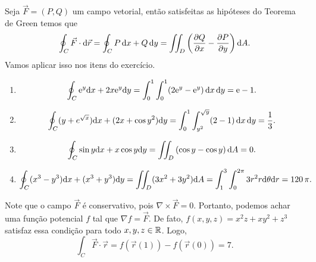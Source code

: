 \begin{questions}
\begin{solution}
Seja $\vec F = (P,Q)$ um campo vetorial, então satisfeitas as hipóteses do Teorema de Green temos que
\[
    \oint_C \vec F \cdot \mathrm{d} \vec r
        = \oint_C P\,\mathrm{d} x + Q\,\mathrm{d} y
        = \iint_D \left(\frac{\partial Q}{\partial x} - \frac{\partial P}{\partial y}\right) \mathrm{d} A.
\]
Vamos aplicar isso nos itens do exercício.
\begin{enumerate}[label=(\alph*)]
  \item 
  \[
    \oint_C \mathrm{e}^y \mathrm{d} x + 2x \mathrm{e}^y \mathrm{d} y
        = \int_0^1\int_0^1 (2\mathrm{e}^y-\mathrm{e}^y)\, \mathrm{d} x\,\mathrm{d} y
        = \mathrm{e}-1.
  \]
  
  \item
  \[
    \oint_C (y + e^{\sqrt{x}}) \mathrm{d} x + (2x + \cos y^2) \mathrm{d} y
        = \int_0^1 \int_{y^2}^{\sqrt{y}} (2 - 1)\, \mathrm{d} x\, \mathrm{d} y
        = \frac{1}{3}.
  \]
  
  \item 
  \[
  \oint_C \sin y \mathrm{d} x + x\cos y \mathrm{d} y
    = \iint_D \left( \cos y - \cos y \right) \mathrm{d} A
    = 0.
  \]
  
  \item 
  \[
    \oint_C (x^3 - y^3) \mathrm{d} x + (x^3 + y^3) \mathrm{d} y
        = \iint_D (3x^2+3y^2) \mathrm{d} A
        = \int_1^3 \int_0^{2\pi} 3 r^2 r\mathrm{d} \theta \mathrm{d} r
        = 120\,\pi.
  \]
\end{enumerate}
\end{solution}


\begin{solution}
    Note que o campo $\vec F$ é conservativo, pois $\nabla\times\vec F = 0$.
    Portanto, podemos achar uma função potencial $f$ tal que $\nabla f = \vec F$.
    De fato, $f(x,y,z) = x^2z+xy^2+z^3$ satisfaz essa condição para todo $x,y,z\in{\mathbb R}$.
    Logo,
    \[
        \int_C \vec F \cdot \vec r = f(\vec r(1)) - f(\vec r(0)) = 7.
    \]
\end{solution}




\end{questions}
